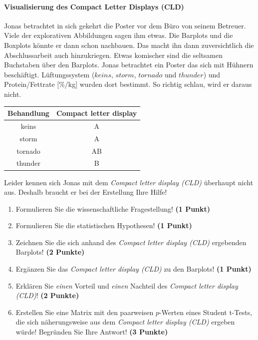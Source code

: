\documentclass[a4paper, 9pt]{scrartcl}\usepackage[]{graphicx}\usepackage[]{xcolor}
\newenvironment{knitrout}{}{} %
\begin{document}
\ifcollection
\paragraph{Visualisierung des Compact Letter Displays (CLD)}
\fi

Jonas betrachtet in sich gekehrt die Poster vor dem Büro von seinem Betreuer. Viele der explorativen Abbildungen sagen ihm etwas. Die Barplots und die Boxplots könnte er dann schon nachbauen. Das macht ihn dann zuversichtlich die Abschlussarbeit auch hinzukriegen. Etwas komischer sind die seltsamen Buchstaben über den Barplots. Jonas betrachtet ein Poster das sich mit Hühnern beschäftigt. Lüftungssystem ($keins$, $storm$, $tornado$ und $thunder$) und Protein/Fettrate [\%/kg] wurden dort bestimmt. So richtig schlau, wird er daraus nicht.

\begin{knitrout}
\color{fgcolor}\begin{table}[!h]
\centering\begingroup\fontsize{10}{12}\selectfont

\begin{tabular}{cc}
\toprule
\textbf{Behandlung} & \textbf{Compact letter display}\\
\midrule
keins & A\\
storm & A\\
tornado & AB\\
thunder & B\\
\bottomrule
\end{tabular}
\endgroup{}
\end{table}

\end{knitrout}

Leider kennen sich Jonas mit dem \textit{Compact letter display (CLD)} überhaupt nicht aus. Deshalb braucht er bei der Erstellung Ihre Hilfe!

\begin{enumerate}
  \item Formulieren Sie die wissenschaftliche Fragestellung! \textbf{(1 Punkt)}
  \item Formulieren Sie die statistischen Hypothesen! \textbf{(1 Punkt)}
\item Zeichnen Sie die sich anhand des \textit{Compact letter display (CLD)} ergebenden Barplots! \textbf{(2 Punkte)}
\item Ergänzen Sie das \textit{Compact letter display (CLD)} zu den Barplots! \textbf{(1 Punkt)}
\item Erklären Sie \textit{einen} Vorteil und \textit{einen} Nachteil des \textit{Compact letter display (CLD)}! \textbf{(2 Punkte)}
\item Erstellen Sie eine Matrix mit den paarweisen $p$-Werten eines Student t-Tests, die sich näherungsweise aus dem \textit{Compact letter display (CLD)} ergeben würde! Begründen Sie Ihre Antwort! \textbf{(3 Punkte)}
\end{enumerate}
\end{document}
